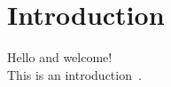 
\section{Introduction} \label{sec:introduction}

Hello and welcome!
\\
This is an introduction~\cite{citation01}.

\clearpage
